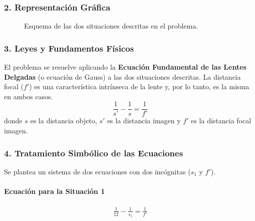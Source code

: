 \subsubsection*{2. Representación Gráfica}
\begin{figure}[H]
    \centering
    \caption{Esquema de las dos situaciones descritas en el problema.}
\end{figure}

\subsubsection*{3. Leyes y Fundamentos Físicos}
El problema se resuelve aplicando la \textbf{Ecuación Fundamental de las Lentes Delgadas} (o ecuación de Gauss) a las dos situaciones descritas. La distancia focal ($f'$) es una característica intrínseca de la lente y, por lo tanto, es la misma en ambos casos.
$$ \frac{1}{s'} - \frac{1}{s} = \frac{1}{f'} $$
donde $s$ es la distancia objeto, $s'$ es la distancia imagen y $f'$ es la distancia focal imagen.

\subsubsection*{4. Tratamiento Simbólico de las Ecuaciones}
Se plantea un sistema de dos ecuaciones con dos incógnitas ($s_1$ y $f'$).

\paragraph*{Ecuación para la Situación 1}
\begin{gather}
    \frac{1}{12} - \frac{1}{s_1} = \frac{1}{f'}
\end{gather}
